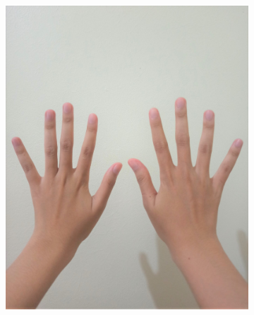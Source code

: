 \documentclass[conference]{IEEEtran}
\begin{document}
\begin{figure} [h]
\begin{center}
\begin{subfigure}[t]{0.11\textwidth}
			\includegraphics[width=\textwidth]{img/pola4.jpg}
			\caption{\label{fig:gs4}}
		\end{subfigure}
		\hspace{0.1em}
		\begin{subfigure}[t]{0.11\textwidth}

\end{subfigure}
\end{center}
\end{figure}
\end{document}
